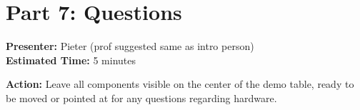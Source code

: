 \documentclass[12pt]{article}
\begin{document}

\section*{Part 7: Questions}
\noindent\textbf{Presenter:} Pieter (prof suggested same as intro person)\\  
\noindent\textbf{Estimated Time:} 5 minutes

\noindent\textbf{Action:} Leave all components visible on the center of the demo table, ready to be moved or pointed at for any questions regarding hardware. 


\end{document}

